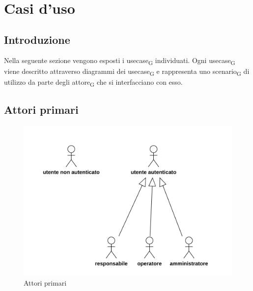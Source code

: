 \section{Casi d'uso}
\subsection{Introduzione}
Nella seguente sezione vengono esposti i usecase\textsubscript{G} individuati. Ogni usecase\textsubscript{G} viene descritto attraverso diagrammi dei usecase\textsubscript{G} e rappresenta uno scenario\textsubscript{G} di utilizzo da parte degli attore\textsubscript{G} che si interfacciano con esso.
\subsection{Attori primari}
\begin{figure}[H]
	\centering
	\includegraphics[scale=0.52]{res/images/gerarchia.png}
	\caption{Attori primari}
\end{figure}
